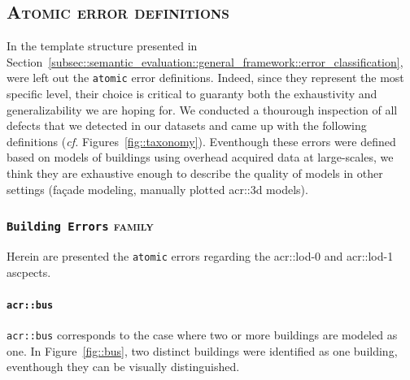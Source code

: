     \subsection{\textsc{Atomic error definitions}}
        \label{subsec::semantic_evaluation::overhead::atomic}
        In the template structure presented in Section~\ref{subsec::semantic_evaluation::general_framework::error_classification}, were left out the \texttt{atomic} error definitions.
        Indeed, since they represent the most specific level, their choice is critical to guaranty both the exhaustivity and generalizability we are hoping for.
        We conducted a thourough inspection of all defects that we detected in our datasets and came up with the following definitions (\textit{cf.} Figures~\ref{fig::taxonomy}).
        Eventhough these errors were defined based on models of buildings using overhead acquired data at large-scales, we think they are exhaustive enough to describe the quality of models in other settings (fa\c{c}ade modeling, manually plotted \gls{acr::3d} models).

        \subsubsection{\texttt{Building Errors} \textsc{family}}
            Herein are presented the \texttt{atomic} errors regarding the \gls{acr::lod}-0 and \gls{acr::lod}-1 ascpects.

            \paragraph{\texttt{\acrlong*{acr::bus}}}
                \texttt{\gls{acr::bus}} corresponds to the case where two or more buildings are modeled as one.
                In Figure~\ref{fig::bus}, two distinct buildings were identified as one building, eventhough they can be visually distinguished.\\

